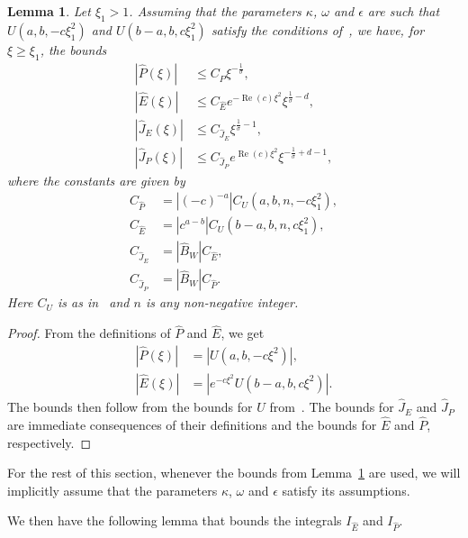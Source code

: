 \documentclass[11pt]{article}
\DeclareMathOperator{\real}{Re}
\newtheorem{lemma}[definition]{Lemma}
\begin{document}
\begin{lemma}\label{lemma:P-hat-E-hat-bounds}
  Let \(\xi_{1} > 1\). Assuming that the parameters \(\kappa\),
  \(\omega\) and \(\epsilon\) are such that \(U(a, b, -c\xi_{1}^{2})\)
  and \(U(b - a, b, c\xi_{1}^{2})\) satisfy the conditions
  of~\cite[Lemma~7.1]{Dahne2024}, we have, for \(\xi \geq \xi_{1}\),
  the bounds
  \begin{align*}
    |\hat{P}(\xi)| &\leq C_{\hat{P}}\xi^{-\frac{1}{\sigma}},\\
    |\hat{E}(\xi)| &\leq C_{\hat{E}}e^{-\real(c)\xi^{2}}\xi^{\frac{1}{\sigma} - d},\\
    |\hat{J}_{E}(\xi)| &\leq C_{\hat{J}_{E}}\xi^{\frac{1}{\sigma} - 1},\\
    |\hat{J}_{P}(\xi)| &\leq C_{\hat{J}_{P}}e^{\real(c)\xi^{2}}\xi^{-\frac{1}{\sigma} + d - 1},
  \end{align*}
  where the constants are given by
  \begin{align*}
    C_{\hat{P}} &= |(-c)^{-a}|C_{U}(a, b, n, -c\xi_{1}^{2}),\\
    C_{\hat{E}} &= |c^{a - b}|C_{U}(b - a, b, n, c\xi_{1}^{2}),\\
    C_{\hat{J}_{E}} &= |\hat{B}_{W}|C_{\hat{E}},\\
    C_{\hat{J}_{P}} &= |\hat{B}_{W}|C_{\hat{P}}.
  \end{align*}
  Here \(C_{U}\) is as in~\cite[Lemma~7.1]{Dahne2024} and \(n\) is any
  non-negative integer.
\end{lemma}

\begin{proof}
  From the definitions of \(\hat{P}\) and \(\hat{E}\), we get
  \begin{align*}
    \left|\hat{P}(\xi)\right| &= |U(a, b, -c\xi^{2})|,\\
    \left|\hat{E}(\xi)\right| &= |e^{-c\xi^{2}}U(b - a, b, c\xi^{2})|.
  \end{align*}
  The bounds then follow from the bounds for \(U\)
  from~\cite[Lemma~7.1]{Dahne2024}. The bounds for \(\hat{J}_{E}\) and
  \(\hat{J}_{P}\) are immediate consequences of their definitions and
  the bounds for \(\hat{E}\) and \(\hat{P}\), respectively.
\end{proof}

For the rest of this section, whenever the bounds from
Lemma~\ref{lemma:P-hat-E-hat-bounds} are used, we will implicitly
assume that the parameters \(\kappa\), \(\omega\) and
\(\epsilon\) satisfy its assumptions.

We then have the following lemma that bounds the integrals
\(I_{\hat{E}}\) and \(I_{\hat{P}}\).
\end{document}
